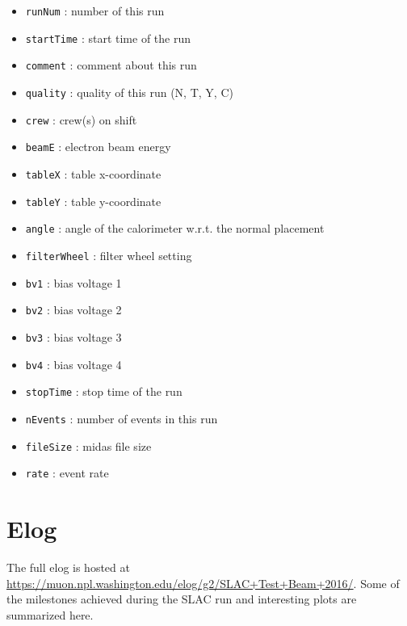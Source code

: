 \begin{itemize}
\item \verb+runNum+ : number of this run
\item \verb+startTime+ : start time of the run
\item \verb+comment+ : comment about this run 
\item \verb+quality+ : quality of this run (N, T, Y, C)
\item \verb+crew+ : crew(s) on shift 
\item \verb+beamE+ : electron beam energy 
\item \verb+tableX+ : table x-coordinate
\item \verb+tableY+ : table y-coordinate
\item \verb+angle+ : angle of the calorimeter w.r.t. the normal placement
\item \verb+filterWheel+ : filter wheel setting
\item \verb+bv1+ : bias voltage 1
\item \verb+bv2+ : bias voltage 2 
\item \verb+bv3+ : bias voltage 3 
\item \verb+bv4+ : bias voltage 4 
\item \verb+stopTime+ : stop time of the run
\item \verb+nEvents+ : number of events in this run
\item \verb+fileSize+ : midas file size
\item \verb+rate+ : event rate
\end{itemize}

\section{Elog}

The full elog is hosted at \url{https://muon.npl.washington.edu/elog/g2/SLAC+Test+Beam+2016/}.
Some of the milestones achieved during the SLAC run and interesting plots are summarized here.

